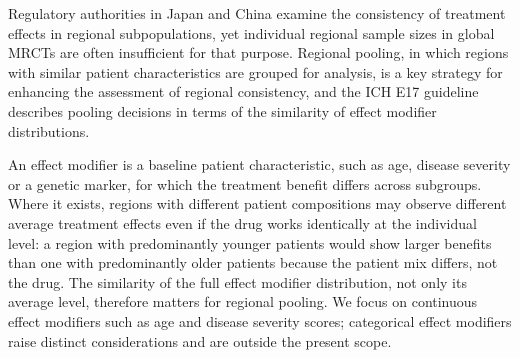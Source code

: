 \documentclass[AMA,Times1COL]{WileyNJDv5}
\begin{document}
Regulatory authorities in Japan and China examine the consistency of treatment effects in regional subpopulations,\cite{matsushima2024,song2025} yet individual regional sample sizes in global MRCTs are often insufficient for that purpose. Regional pooling, in which regions with similar patient characteristics are grouped for analysis, is a key strategy for enhancing the assessment of regional consistency, and the ICH E17 guideline describes pooling decisions in terms of the similarity of effect modifier distributions.\cite{iche17}

An effect modifier is a baseline patient characteristic, such as age, disease severity or a genetic marker, for which the treatment benefit differs across subgroups. Where it exists, regions with different patient compositions may observe different average treatment effects even if the drug works identically at the individual level: a region with predominantly younger patients would show larger benefits than one with predominantly older patients because the patient mix differs, not the drug. The similarity of the full effect modifier distribution, not only its average level, therefore matters for regional pooling. We focus on continuous effect modifiers such as age and disease severity scores; categorical effect modifiers raise distinct considerations and are outside the present scope.

\end{document}
